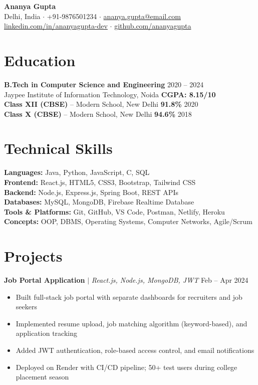 \documentclass[10pt,a4paper]{article}
\begin{document}
\begin{center}
{\fontsize{18}{22}\selectfont\bfseries\color{accent} Ananya Gupta}\\[5pt]
Delhi, India $\cdot$ +91-9876501234 $\cdot$ \href{mailto:ananya.gupta@email.com}{ananya.gupta@email.com}\\[2pt]
\href{https://linkedin.com/in/ananyagupta-dev}{linkedin.com/in/ananyagupta-dev} $\cdot$ \href{https://github.com/ananyagupta}{github.com/ananyagupta}
\end{center}

\section{Education}
\textbf{B.Tech in Computer Science and Engineering} \hfill 2020 -- 2024\\
Jaypee Institute of Information Technology, Noida \hfill \textbf{\color{accent}CGPA: 8.15/10}\\[4pt]
\textbf{Class XII (CBSE)} -- Modern School, New Delhi \hfill \textbf{91.8\%} \hfill 2020\\
\textbf{Class X (CBSE)} -- Modern School, New Delhi \hfill \textbf{94.6\%} \hfill 2018

\section{Technical Skills}
\textbf{Languages:} Java, Python, JavaScript, C, SQL\\
\textbf{Frontend:} React.js, HTML5, CSS3, Bootstrap, Tailwind CSS\\
\textbf{Backend:} Node.js, Express.js, Spring Boot, REST APIs\\
\textbf{Databases:} MySQL, MongoDB, Firebase Realtime Database\\
\textbf{Tools \& Platforms:} Git, GitHub, VS Code, Postman, Netlify, Heroku\\
\textbf{Concepts:} OOP, DBMS, Operating Systems, Computer Networks, Agile/Scrum

\section{Projects}
\textbf{\color{accent}Job Portal Application} $\mid$ \textit{React.js, Node.js, MongoDB, JWT} \hfill Feb -- Apr 2024
\begin{itemize}
    \item Built full-stack job portal with separate dashboards for recruiters and job seekers
    \item Implemented resume upload, job matching algorithm (keyword-based), and application tracking
    \item Added JWT authentication, role-based access control, and email notifications
    \item Deployed on Render with CI/CD pipeline; 50+ test users during college placement season
\end{itemize}
\end{document}
